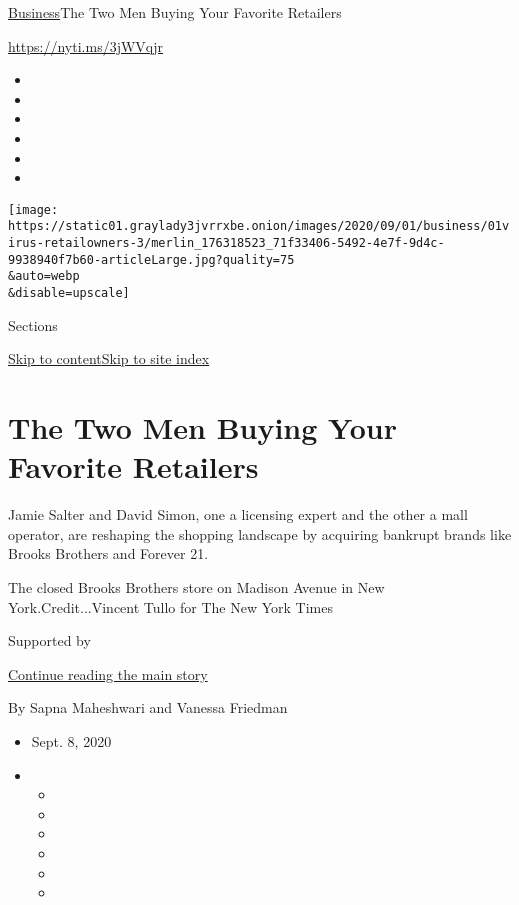 \href{/section/business}{Business}\textbar{}The Two Men Buying Your
Favorite Retailers

\url{https://nyti.ms/3jWVqjr}

\begin{itemize}
\item
\item
\item
\item
\item
\item
\end{itemize}

\texttt{[image: https://static01.graylady3jvrrxbe.onion/images/2020/09/01/business/01virus-retailowners-3/merlin\_176318523\_71f33406-5492-4e7f-9d4c-9938940f7b60-articleLarge.jpg?quality=75\\\&auto=webp\\\&disable=upscale]}

Sections

\protect\hyperlink{site-content}{Skip to
content}\protect\hyperlink{site-index}{Skip to site index}

\hypertarget{the-two-men-buying-your-favorite-retailers}{%
\section{The Two Men Buying Your Favorite
Retailers}\label{the-two-men-buying-your-favorite-retailers}}

Jamie Salter and David Simon, one a licensing expert and the other a
mall operator, are reshaping the shopping landscape by acquiring
bankrupt brands like Brooks Brothers and Forever 21.

The closed Brooks Brothers store on Madison Avenue in New
York.Credit...Vincent Tullo for The New York Times

Supported by

\protect\hyperlink{after-sponsor}{Continue reading the main story}

By Sapna Maheshwari and Vanessa Friedman

\begin{itemize}
\item
  Sept. 8, 2020
\item
  \begin{itemize}
  \item
  \item
  \item
  \item
  \item
  \item
  \end{itemize}
\end{itemize}

